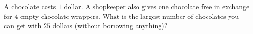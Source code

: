 A chocolate costs $1$ dollar. A shopkeeper also gives one chocolate free in exchange for $4$ empty chocolate wrappers. What is the largest number of chocolates you can get with $25$ dollars (without borrowing anything)?
